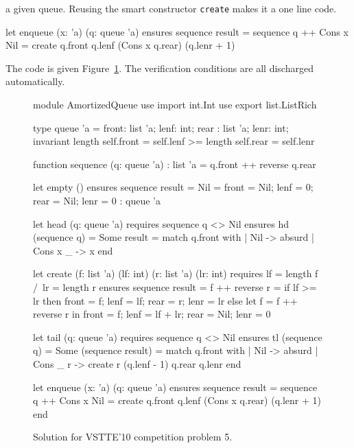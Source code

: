 a given queue. Reusing the smart constructor \texttt{create} makes it
a one line code.
\begin{whycode}
  let enqueue (x: 'a) (q: queue 'a)
    ensures { sequence result = sequence q ++ Cons x Nil }
  = create q.front q.lenf (Cons x q.rear) (q.lenr + 1)
\end{whycode}
The code is given Figure~\ref{fig:AQueue}.
The verification conditions are all discharged automatically.
\begin{figure}[p]
  \centering
\begin{whycode}
module AmortizedQueue
  use import int.Int
  use export list.ListRich

  type queue 'a = { front: list 'a; lenf: int;
                    rear : list 'a; lenr: int; }
  invariant {
    length self.front = self.lenf >= length self.rear = self.lenr }

  function sequence (q: queue 'a) : list 'a = q.front ++ reverse q.rear

  let empty () ensures { sequence result = Nil }
  = { front = Nil; lenf = 0; rear = Nil; lenr = 0 } : queue 'a

  let head (q: queue 'a)
    requires { sequence q <> Nil }
    ensures { hd (sequence q) = Some result }
  = match q.front with
      | Nil      -> absurd
      | Cons x _ -> x
    end

  let create (f: list 'a) (lf: int) (r: list 'a) (lr: int)
    requires { lf = length f /\ lr = length r }
    ensures  { sequence result = f ++ reverse r }
  = if lf >= lr then
      { front = f; lenf = lf; rear = r; lenr = lr }
    else
      let f = f ++ reverse r in
      { front = f; lenf = lf + lr; rear = Nil; lenr = 0 }

  let tail (q: queue 'a)
    requires { sequence q <> Nil }
    ensures  { tl (sequence q) = Some (sequence result) }
  = match q.front with
      | Nil      -> absurd
      | Cons _ r -> create r (q.lenf - 1) q.rear q.lenr
    end

  let enqueue (x: 'a) (q: queue 'a)
    ensures { sequence result = sequence q ++ Cons x Nil }
  = create q.front q.lenf (Cons x q.rear) (q.lenr + 1)
end
\end{whycode}
\vspace*{-1em}%
  \caption{Solution for VSTTE'10 competition problem 5.}
  \label{fig:AQueue}
\end{figure}



